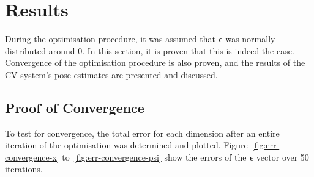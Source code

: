 \section{Results}

During the optimisation procedure, it was assumed that $\bm{\epsilon}$ was normally distributed around 0. In this section, it is proven that this is indeed the case. Convergence of the optimisation procedure is also proven, and the results of the CV system's pose estimates are presented and discussed.

\subsection{Proof of Convergence}

To test for convergence, the total error for each dimension after an entire iteration of the optimisation was determined and plotted. Figure~\ref{fig:err-convergence-x} to~\ref{fig:err-convergence-psi} show the errors of the $\bm{\epsilon}$ vector over 50 iterations.

